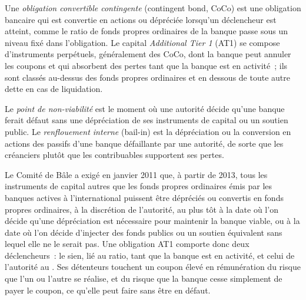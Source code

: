 \begin{definition}\label{def:m2:distressed-sovereign-and-bank-capital-credit:coco}
Une \emph{obligation convertible contingente} (contingent  bond, CoCo) est une
obligation bancaire qui est convertie en actions ou dépréciée lorsqu'un déclencheur est atteint, comme
le ratio de fonds propres ordinaires de la banque passe sous un niveau fixé dans l'obligation. Le capital \emph{Additional
Tier 1} (AT1) se compose d'instruments perpétuels,
généralement des CoCo, dont la banque peut annuler les coupons et qui absorbent des pertes tant que la
banque est en activité~; ils sont classés au-dessus des fonds propres ordinaires et en dessous de toute autre dette en cas de
liquidation.
\end{definition}

\begin{definition}\label{def:m2:distressed-sovereign-and-bank-capital-credit:pon}
Le \emph{point de non-viabilité} est le moment où
une autorité décide qu'une banque ferait défaut sans une dépréciation de ses instruments de capital
ou un soutien public. Le \emph{renflouement interne} (bail-in) est la dépréciation ou
la conversion en actions des passifs d'une banque défaillante par une autorité, de sorte que
les créanciers plutôt que les contribuables supportent ses pertes.
\end{definition}

Le Comité de Bâle a exigé en janvier 2011 que, à partir de 2013, tous les instruments de capital
autres que les fonds propres ordinaires émis par les banques actives à l'international puissent être dépréciés ou
convertis en fonds propres ordinaires, à la discrétion de l'autorité, au plus tôt à la date où l'on décide
qu'une dépréciation est nécessaire pour maintenir la banque viable, ou à la date où l'on décide d'injecter des fonds publics
ou un soutien équivalent sans lequel elle ne le serait pas. Une obligation AT1
comporte donc deux déclencheurs~: le sien, lié au ratio, tant que la banque est en activité, et
celui de l'autorité au . Ses détenteurs touchent un coupon élevé en rémunération
du risque que l'un ou l'autre se réalise, et du risque que la banque cesse simplement de payer le
coupon, ce qu'elle peut faire sans être en défaut.

